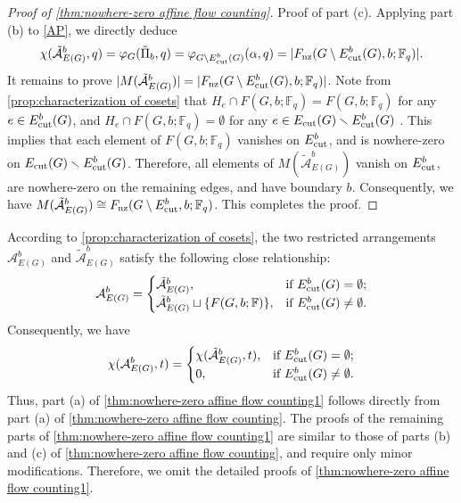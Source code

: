 \documentclass[12pt]{article}%
\renewcommand*{\bm}[1]{#1}%
\numberwithin{equation}{section}
\begin{document}
\begin{proof}[Proof of \autoref{thm:nowhere-zero affine flow counting}]
Proof of part (c). Applying part (b) to \eqref{AP}, we directly deduce
\[
\chi(\tilde{\mathcal{A}}_{E(G)}^{\bm b},q)=\varphi_G(\tilde{\Pi}_{\bm b},q)=\varphi_{G\setminus E_{\rm cut}^{\bm b}(G)}(\alpha,q)=|F_{\rm nz}(G\setminus E_{\rm cut}^{\bm b}(G),\bm b;\mathbb{F}_q)|.
\]
It remains to prove $|M(\tilde{\mathcal{A}}_{E(G)}^{\bm b})|=|F_{\rm nz}(G\setminus E^{\bm b}_{\rm cut}(G),\bm b;\mathbb{F}_q)|$. Note from \autoref{prop:characterization of cosets} that $H_e\cap F(G,\bm b;\mathbb{F}_q)=F(G,\bm b;\mathbb{F}_q)$ for any $e\in E_{\rm cut}^{\bm b}(G)$, and $H_e\cap F(G,\bm b;\mathbb{F}_q)=\emptyset$ for any $e\in E_{\rm cut}(G)\smallsetminus E_{\rm cut}^{\bm b}(G)$ . This implies that each element of $F(G,\bm b;\mathbb{F}_q)$ vanishes on $E^{\bm b}_{\rm cut}$, and is nowhere-zero on $E_{\rm cut}(G)\smallsetminus E_{\rm cut}^{\bm b}(G)$. Therefore, all elements of  $M(\tilde{\mathcal{A}}_{E(G)}^{\bm b})$ vanish on $E^{\bm b}_{\rm cut}$, are nowhere-zero on the remaining edges, and have boundary $\bm b$. Consequently, we have $M(\tilde{\mathcal{A}}_{E(G)}^{\bm b})\cong F_{\rm nz}(G\setminus E^{\bm b}_{\rm cut},\bm b;\mathbb{F}_q)$. This completes the proof.
\end{proof}

According to \autoref{prop:characterization of cosets}, the two restricted arrangements $\mathcal{A}_{E(G)}^{\bm b}$ and $\tilde{\mathcal{A}}_{E(G)}^{\bm b}$ satisfy  the following close relationship:
\[
\mathcal{A}_{E(G)}^{\bm b}=
\begin{cases}\tilde{\mathcal{A}}_{E(G)}^{\bm b},&\text{if }E_{\rm cut}^{\bm b}(G)=\emptyset;\\
\tilde{\mathcal{A}}_{E(G)}^{\bm b}\sqcup\{F(G,\bm b;\mathbb{F})\},&\text{if }E_{\rm cut}^{\bm b}(G)\ne\emptyset.
\end{cases}
\]
Consequently, we have
\[
\chi(\mathcal{A}_{E(G)}^{\bm b},t)=
\begin{cases}
\chi(\tilde{\mathcal{A}}_{E(G)}^{\bm b},t),&\text{if }E_{\rm cut}^{\bm b}(G)=\emptyset;\\
0,&\text{if }E_{\rm cut}^{\bm b}(G)\ne\emptyset.
\end{cases}
\]
Thus, part (a) of \autoref{thm:nowhere-zero affine flow counting1} follows directly from part (a)  of  \autoref{thm:nowhere-zero affine flow counting}. The proofs of the remaining parts of \autoref{thm:nowhere-zero affine flow counting1} are similar to those of parts (b) and (c) of \autoref{thm:nowhere-zero affine flow counting}, and require only minor modifications. Therefore, we omit the detailed proofs  of \autoref{thm:nowhere-zero affine flow counting1}. 
\end{document}
